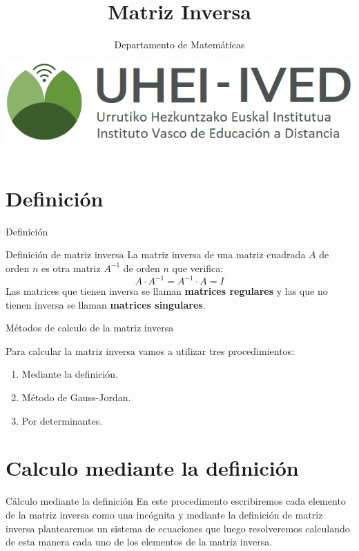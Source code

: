\documentclass[9pt,aspectratio=159]{beamer}
\author{Departamento de Matemáticas}
\title{Matriz Inversa}
\date{\includegraphics[scale=0.15]{../imagenes/logoa.jpg}}
\begin{document}
\begin{frame}
\titlepage
\end{frame}

\begin{frame}
\tableofcontents
\end{frame}

\section{Definición}

\begin{frame}{Definición}

\begin{alertblock}{Definición de matriz inversa}
La matriz inversa de una matriz cuadrada $A$ de orden $n$ es otra matriz $A^{-1}$ de orden $n$ que verifica:
\[
A\cdot A^{-1}=A^{-1} \cdot A = I
\]
Las matrices que tienen inversa se llaman \textbf{matrices regulares} y las que no tienen inversa se llaman \textbf{matrices singulares}.
\end{alertblock}
\end{frame}


\begin{frame}{Métodos de calculo de la matriz inversa}

Para calcular la matriz inversa vamos a utilizar tres procedimientos:
\begin{enumerate}[<+-|alert@+>]
\item Mediante la definición.
\item Método de Gauss-Jordan.
\item Por determinantes.
\end{enumerate}

\end{frame}

\section{Calculo mediante la definición}

\begin{frame}{Cálculo mediante la definición}
En este procedimento escribiremos cada elemento de la matriz inversa como una incógnita y mediante la definición de matriz inversa plantearemos un sistema de ecuaciones que luego resolveremos calculando de esta manera cada uno de los elementos de la matriz inversa.

\end{frame}
\end{document}
